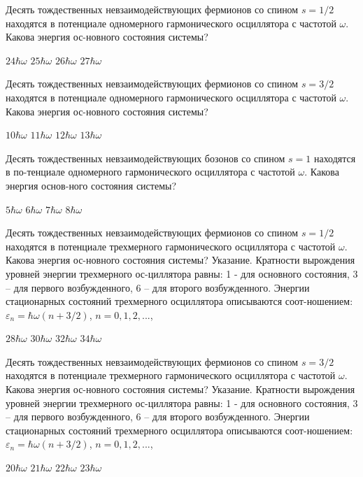 \documentclass[11pt,a4paper]{exam}
\begin{document}
\begin{questions}
\question Десять тождественных невзаимодействующих фермионов со спином $s = 1/2$ находятся в потенциале одномерного гармонического осциллятора с частотой $\omega $. Какова энергия ос-новного состояния системы? 
\begin{choices}
\choice $24\hbar \omega $ 
\choice $25\hbar \omega $ 
\choice $26\hbar \omega $ 
\choice $27\hbar \omega $
\end{choices}

\question Десять тождественных невзаимодействующих фермионов со спином $s = 3/2$ находятся в потенциале одномерного гармонического осциллятора с частотой $\omega $. Какова энергия ос-новного состояния системы? 
\begin{choices}
\choice $10\hbar \omega $ 
\choice $11\hbar \omega $ 
\choice $12\hbar \omega $ 
\choice $13\hbar \omega $
\end{choices}

\question Десять тождественных невзаимодействующих бозонов со спином $s = 1$ находятся в по-тенциале одномерного гармонического осциллятора с частотой $\omega $. Какова энергия основ-ного состояния системы? 
\begin{choices}
\choice $5\hbar \omega $  
\choice $6\hbar \omega $  
\choice $7\hbar \omega $  
\choice $8\hbar \omega $
\end{choices}

\question Десять тождественных невзаимодействующих фермионов со спином $s = 1/2$ находятся в потенциале трехмерного гармонического осциллятора с частотой $\omega $. Какова энергия ос-новного состояния системы? Указание. Кратности вырождения уровней энергии трехмерного ос-циллятора равны: 1 - для основного состояния, 3 – для первого возбужденного, 6 – для второго возбужденного. Энергии стационарных состояний трехмерного осциллятора описываются соот-ношением: ${\varepsilon _n} = \hbar \omega (n + 3/2)$, $n = 0,1,2,...$,
\begin{choices}
\choice $28\hbar \omega $ 
\choice $30\hbar \omega $ 
\choice $32\hbar \omega $ 
\choice $34\hbar \omega $
\end{choices}

\question Десять тождественных невзаимодействующих фермионов со спином $s = 3/2$ находятся в потенциале трехмерного гармонического осциллятора с частотой $\omega $. Какова энергия ос-новного состояния системы? Указание. Кратности вырождения уровней энергии трехмерного ос-циллятора равны: 1 - для основного состояния, 3 – для первого возбужденного, 6 – для второго возбужденного. Энергии стационарных состояний трехмерного осциллятора описываются соот-ношением: ${\varepsilon _n} = \hbar \omega (n + 3/2)$, $n = 0,1,2,...$,
\begin{choices}
\choice $20\hbar \omega $ 
\choice $21\hbar \omega $ 
\choice $22\hbar \omega $ 
\choice $23\hbar \omega $
\end{choices}


\end{questions}
\end{document}
